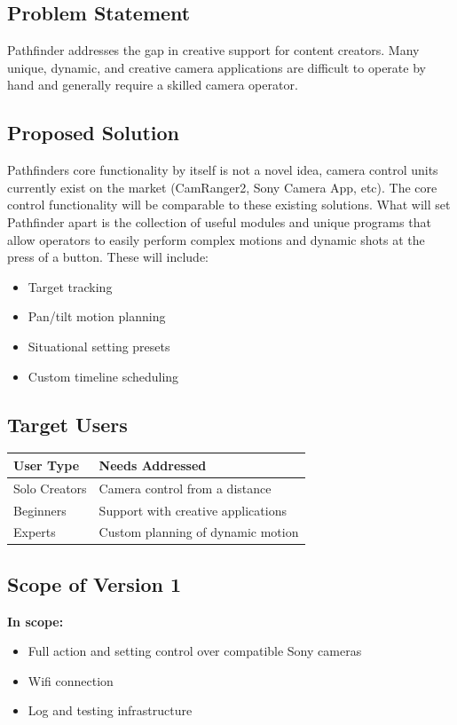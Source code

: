 \documentclass[11pt,a4paper]{article}
\begin{document}
\subsection{Problem Statement}
Pathfinder addresses the gap in creative support for content creators. Many unique, dynamic, and creative camera applications are difficult to operate by hand and generally require a skilled camera operator.\\

\subsection{Proposed Solution}
Pathfinders core functionality by itself is not a novel idea, camera control units currently exist on the market (CamRanger2, Sony Camera App, etc). The core control functionality will be comparable to these existing solutions. What will set Pathfinder apart is the collection of useful modules and unique programs that allow operators to easily perform complex motions and dynamic shots at the press of a button. These will include:
\begin{itemize}[leftmargin=1.5em]
    \item Target tracking
    \item Pan/tilt motion planning
    \item Situational setting presets
    \item Custom timeline scheduling
\end{itemize}

\subsection{Target Users}
\begin{tabular}{p{} p{}}
    \toprule
    \textbf{User Type} & \textbf{Needs Addressed} \\
    \midrule
    Solo Creators & Camera control from a distance \\
    Beginners & Support with creative applications \\
    Experts & Custom planning of dynamic motion \\
    \bottomrule
\end{tabular}

\subsection{Scope of Version 1}
\textbf{In scope:}
\begin{itemize}[leftmargin=1.5em]
    \item Full action and setting control over compatible Sony cameras
    \item Wifi connection
    \item Log and testing infrastructure
\end{itemize}
\end{document}
